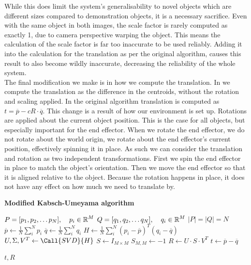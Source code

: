While this does limit the system's generalisability to novel objects which are different sizes compared to demonstration objects, it is a necessary sacrifice. Even with the same object in both images, the scale factor is rarely computed as exactly 1, due to camera perspective warping the object. This means the calculation of the scale factor is far too inaccurate to be used reliably. Adding it into the calculation for the translation as per the original algorithm, causes this result to also become wildly inaccurate, decreasing the reliability of the whole system.\\

The final modification we make is in how we compute the translation. In  we compute the translation as the difference in the centroids, without the rotation and scaling applied. In the original algorithm translation is computed as $t = \overline{p} - cR \cdot \overline{q}$. This change is a result of how our environment is set up. Rotations are applied about the current object position. This is the case for all objects, but especially important for the end effector. When we rotate the end effector, we do not rotate about the world origin, we rotate about the end effector's current position, effectively spinning it in place. As such we can consider the translation and rotation as two independent transformations. First we spin the end effector in place to match the object's orientation. Then we move the end effector so that it is aligned relative to the object. Because the rotation happens in place, it does not have any effect on how much we need to translate by.\\

\begin{algorithm}
    \setlength{\baselineskip}{18pt}
    \caption{\textbf{Modified Kabsch-Umeyama algorithm}}
    \label{alg:modified-kabsch}
    \begin{algorithmic}[1]
        \Require $P = [p_1, p_2, \dots p_N], \operatorname{\: \: \: \:} p_i \in \operatorname{\mathbb{R}}^M$
        \Statex $Q = [q_1, q_2, \dots q_N], \operatorname{\: \: \: \:} q_i \in \operatorname{\mathbb{R}}^M$
        \Ensure $|P| = |Q| = N$
            \State $\overline{p} \gets \frac{1}{N}\sum^N_{i} p_i$
            \State $\overline{q} \gets \frac{1}{N}\sum^N_{i} q_i$
            \State $H \gets \frac{1}{N}\sum^N_{i} (p_i - \overline{p})^T(q_i - \overline{q})$ 
            \State $U, \Sigma, V^T \gets \Call{SVD}{H}$ 
            \State $S \gets I_{M \times M}$ 
             
                \State $S_{M,M} \gets -1$                 
            \EndIf
            \State $R \gets U \cdot S \cdot V^T$
            \State $t \gets \overline{p} - \overline{q} $
    
            \State \Output $t, R$
        \EndProcedure
        
    \end{algorithmic}
\end{algorithm}

